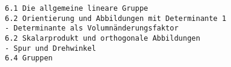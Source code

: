 \begin{verbatim}
6.1 Die allgemeine lineare Gruppe
6.2 Orientierung und Abbildungen mit Determinante 1
- Determinante als Volumnänderungsfaktor
6.2 Skalarprodukt und orthogonale Abbildungen
- Spur und Drehwinkel
6.4 Gruppen
\end{verbatim}
